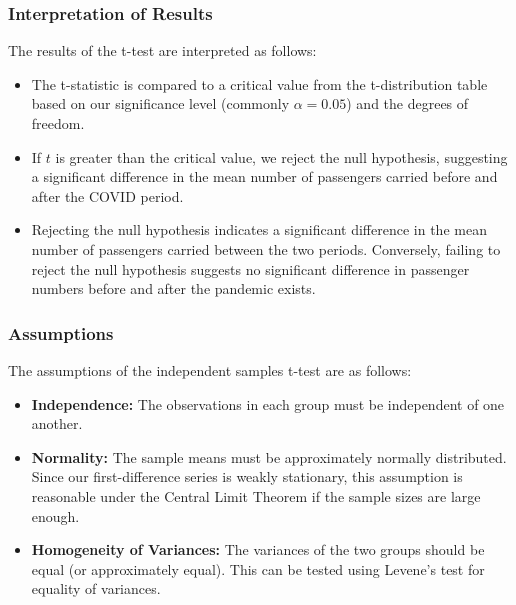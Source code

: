\documentclass[
]{article}
\begin{document}
\subsubsection{Interpretation of Results}

The results of the t-test are interpreted as follows:

\begin{itemize}
\def\labelenumi{\roman{enumi}.}
\item
  The t-statistic is compared to a critical value from the
  t-distribution table based on our significance level (commonly $\alpha = 0.05$) and the degrees of freedom.
\item
 If $t$ is greater than the critical value, we reject the null hypothesis, suggesting a   significant difference in the mean number of passengers carried before and after the COVID period.
\item
  Rejecting the null hypothesis indicates a significant difference in
  the mean number of passengers carried between the two periods.
  Conversely, failing to reject the null hypothesis suggests no
  significant difference in passenger numbers before and after the
  pandemic exists.
\end{itemize}

\subsubsection{Assumptions}

The assumptions of the independent samples t-test are as follows:

\begin{itemize}
\item
  \textbf{Independence:} The observations in each group must be
  independent of one another.
\item
  \textbf{Normality:} The sample means must be approximately normally
  distributed. Since our first-difference series is weakly stationary,
  this assumption is reasonable under the Central Limit Theorem if the
  sample sizes are large enough.
\item
  \textbf{Homogeneity of Variances:} The variances of the two groups
  should be equal (or approximately equal). This can be tested using
  Levene's test for equality of variances.
\end{itemize}
\end{document}
